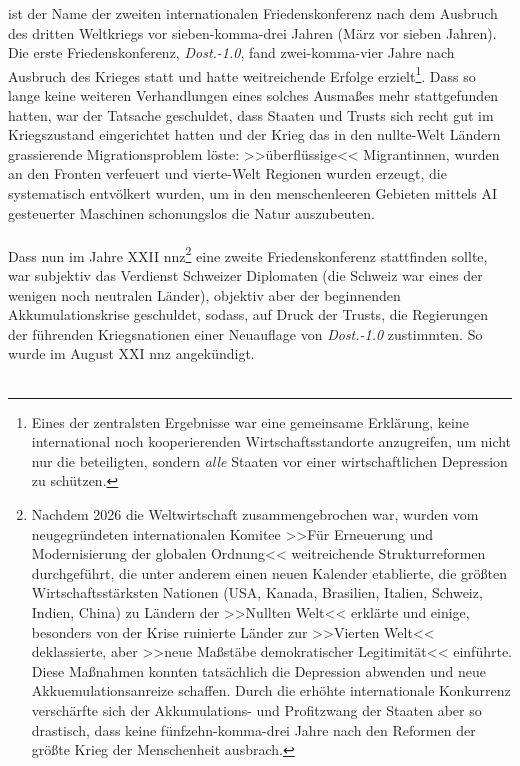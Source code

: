 \game{} ist der Name der zweiten internationalen Friedenskonferenz nach dem
Ausbruch des dritten Weltkriegs vor sieben-komma-drei Jahren (März vor sieben
Jahren).
Die erste Friedenskonferenz, \emph{Dost.-1.0}, fand zwei-komma-vier Jahre nach
Ausbruch des Krieges statt und hatte weitreichende Erfolge erzielt\footnote{
  Eines der zentralsten Ergebnisse war eine gemeinsame Erklärung, keine
  international noch kooperierenden Wirtschaftsstandorte anzugreifen, um nicht
  nur die beteiligten, sondern \emph{alle} Staaten vor einer wirtschaftlichen
  Depression zu schützen.
}.
Dass so lange keine weiteren Verhandlungen eines solches Ausmaßes mehr
stattgefunden hatten, war der Tatsache geschuldet, dass Staaten und Trusts sich
recht gut im Kriegszustand eingerichtet hatten und der Krieg das in den
nullte-Welt Ländern grassierende Migrationsproblem löste: >>überflüssige<<
Migrantinnen, wurden an den Fronten verfeuert und vierte-Welt Regionen wurden
erzeugt, die systematisch entvölkert wurden, um in den menschenleeren Gebieten
mittels AI gesteuerter Maschinen schonungslos die Natur auszubeuten.\\\\
Dass nun im Jahre XXII \ac{nnz}\footnote{
  Nachdem 2026 die Weltwirtschaft zusammengebrochen war, wurden vom
  neugegründeten internationalen Komitee >>Für Erneuerung und Modernisierung der
  globalen Ordnung<< weitreichende Strukturreformen durchgeführt, die
  unter anderem einen neuen Kalender etablierte, die größten
  Wirtschaftsstärksten Nationen (USA, Kanada, Brasilien, Italien, Schweiz,
  Indien, China) zu Ländern der >>Nullten Welt<< erklärte und einige, besonders
  von der Krise ruinierte Länder zur >>Vierten Welt<< deklassierte, aber >>neue
  Maßstäbe demokratischer Legitimität<< einführte.
  Diese Maßnahmen konnten tatsächlich die Depression abwenden und neue
  Akkuemulationsanreize schaffen. 
  Durch die erhöhte internationale Konkurrenz verschärfte sich der
  Akkumulations- und Profitzwang der Staaten aber so drastisch, dass keine
  fünfzehn-komma-drei Jahre nach den Reformen der größte Krieg der Menschenheit
  ausbrach.
} eine zweite Friedenskonferenz stattfinden sollte, war subjektiv das Verdienst
Schweizer Diplomaten (die Schweiz war eines der wenigen noch neutralen Länder),
objektiv aber der beginnenden Akkumulationskrise geschuldet, sodass, auf Druck
der Trusts, die Regierungen der führenden Kriegsnationen einer Neuauflage von
\emph{Dost.-1.0} zustimmten. 
So wurde im August XXI \ac{nnz} \game{} angekündigt.\\\\
